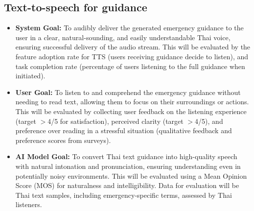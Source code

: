 \subsection{Text-to-speech for guidance}
\label{subsec:goal_tts_guidance}
\begin{itemize}
    \item \textbf{System Goal:} To audibly deliver the generated emergency guidance to the user in a clear, natural-sounding, and easily understandable Thai voice, ensuring successful delivery of the audio stream. This will be evaluated by the feature adoption rate for TTS (users receiving guidance decide to listen), and task completion rate (percentage of users listening to the full guidance when initiated).
    \item \textbf{User Goal:} To listen to and comprehend the emergency guidance without needing to read text, allowing them to focus on their surroundings or actions. This will be evaluated by collecting user feedback on the listening experience (target $>$4/5 for satisfaction), perceived clarity (target $>$4/5), and preference over reading in a stressful situation (qualitative feedback and preference scores from surveys).
    \item \textbf{AI Model Goal:} To convert Thai text guidance into high-quality speech with natural intonation and pronunciation, ensuring understanding even in potentially noisy environments. This will be evaluated using a Mean Opinion Score (MOS) for naturalness and intelligibility. Data for evaluation will be Thai text samples, including emergency-specific terms, assessed by Thai listeners.
\end{itemize}

